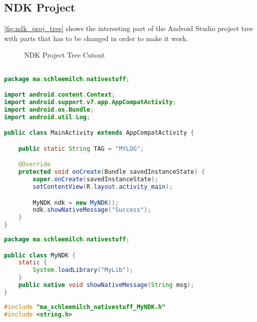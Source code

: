\begin{appendices}
\chapter{NDK Project}\label{chapter:ndk_sample_project}

\autoref{fig:ndk_proj_tree} shows the interesting part of the Android Studio project tree
with parts that has to be changed in order to make it work.

\begin{figure}[htb]
\caption[NDK Project Tree Cutout]{NDK Project Tree Cutout}
\label{fig:ndk_proj_tree}
\end{figure}

\begin{lstlisting}[language=Java, caption=MainActivity.java, label=nkd_sample_main]

package ma.schleemilch.nativestuff;

import android.content.Context;
import android.support.v7.app.AppCompatActivity;
import android.os.Bundle;
import android.util.Log;

public class MainActivity extends AppCompatActivity {

    public static String TAG = "MYLOG";

    @Override
    protected void onCreate(Bundle savedInstanceState) {
        super.onCreate(savedInstanceState);
        setContentView(R.layout.activity_main);

        MyNDK ndk = new MyNDK();
        ndk.showNativeMessage("Success");
    }
}
\end{lstlisting}

\begin{lstlisting}[language=Java, caption=MyNDK.java, label=nkd_sample_interface]
package ma.schleemilch.nativestuff;

public class MyNDK {
    static {
        System.loadLibrary("MyLib");
    }
    public native void showNativeMessage(String msg);
}
\end{lstlisting}

\begin{lstlisting}[language=C++, caption=mylib.cpp, label=nkd_sample_cpp]
#include "ma_schleemilch_nativestuff_MyNDK.h"
#include <string.h>


\end{lstlisting}
\end{appendices}
